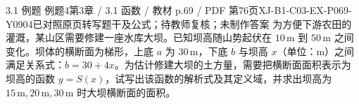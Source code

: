 \par\noindent\begin{minipage}{\linewidth}
\begin{bankitem}{3.1 例题 例题4}{第3章 / 3.1 函数 / 教材 p.69 / PDF 第76页}{XJ-B1-C03-EX-P069-Y0904}{已对照原页转写题干及公式；待教师复核；未制作答案}
为方便下游农田的灌溉，某山区需要修建一座水库大坝。已知坝高随山势起伏在 $10\,\mathrm m$ 到 $50\,\mathrm m$ 之间变化。坝体的横断面为梯形，上底 $a$ 为 $30\,\mathrm m$，下底 $b$ 与坝高 $x$（单位：$\mathrm m$）之间满足关系式：$b=30+4x$。为估计修建大坝的土方量，需要把横断面面积表示为坝高的函数 $y=S(x)$，试写出该函数的解析式及其定义域，并求出坝高为 $15\,\mathrm m,20\,\mathrm m,30\,\mathrm m$ 时大坝横断面的面积。
\end{bankitem}
\end{minipage}\par\medskip
